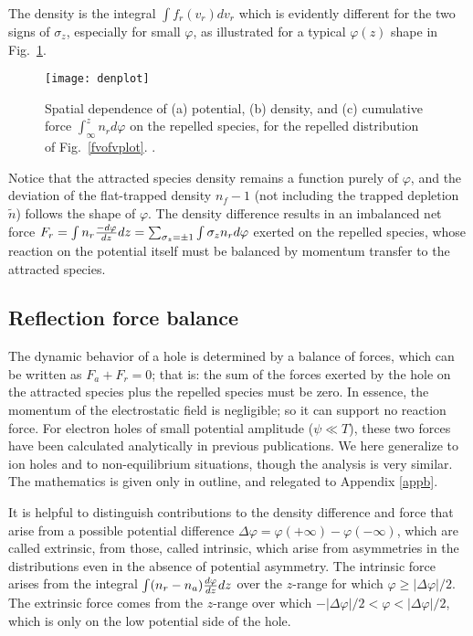 \documentclass[aip,pop,article-title]{revtex4-2}
\begin{document}
The density is the integral $\int f_r(v_r) dv_r$ which is evidently
different for the two signs of $\sigma_z$, especially for small
$\varphi$, as illustrated for a typical $\varphi(z)$ shape in Fig.\
\ref{denplot}.
\begin{figure}[htp]\centering
  \texttt{[image: denplot]}
  \caption{Spatial dependence of (a) potential, (b) density, and (c)
    cumulative force $\int_\infty^z n_rd\varphi$ on the repelled
    species, for the repelled distribution of Fig.\ \ref{fvofvplot}.
    . \label{denplot}}
\end{figure}
Notice that the attracted species density remains a function purely of
$\varphi$, and the deviation of the flat-trapped density $n_f-1$ (not
including the trapped depletion $\tilde n$) follows the shape of
$\varphi$.  The density difference results in an imbalanced net force
$F_r=\int n_r {-d\varphi\over dz} dz=\sum_{\sigma_z=\pm1}\int \sigma_zn_r
d\varphi$ exerted on the repelled species, whose reaction on the
potential itself must be balanced by momentum transfer to the
attracted species.

\subsection{Reflection force balance}

The dynamic behavior of a hole is determined by a balance of forces,
which can be written as $F_a+F_r=0$; that is: the sum of the forces
exerted by the hole on the attracted species plus the repelled species
must be zero. In essence, the momentum of the electrostatic field is
negligible; so it can support no reaction force. For electron holes of
small potential amplitude (${\psi}\ll T$), these two forces have been
calculated analytically in previous
publications\cite{Hutchinson2016,Hutchinson2017}. We here generalize
to ion holes and to non-equilibrium situations, though the analysis is
very similar. The mathematics is given only in outline, and relegated
to Appendix \ref{appb}.

It is helpful to distinguish contributions to the density difference
and force that arise from a possible potential difference
$\Delta \varphi=\varphi(+\infty)-\varphi(-\infty)$, which are called
extrinsic, from those, called intrinsic, which arise from asymmetries
in the distributions even in the absence of potential asymmetry. The
intrinsic force arises from the integral $\int(n_r-n_a) {d\varphi\over
  dz} dz$ over the $z$-range for which
$ \varphi\ge|\Delta\varphi|/2$. The extrinsic force comes from the
$z$-range over which
$-|\Delta\varphi|/2<\varphi<|\Delta\varphi|/2$, which is only on the low potential side
of the hole.
\end{document}
